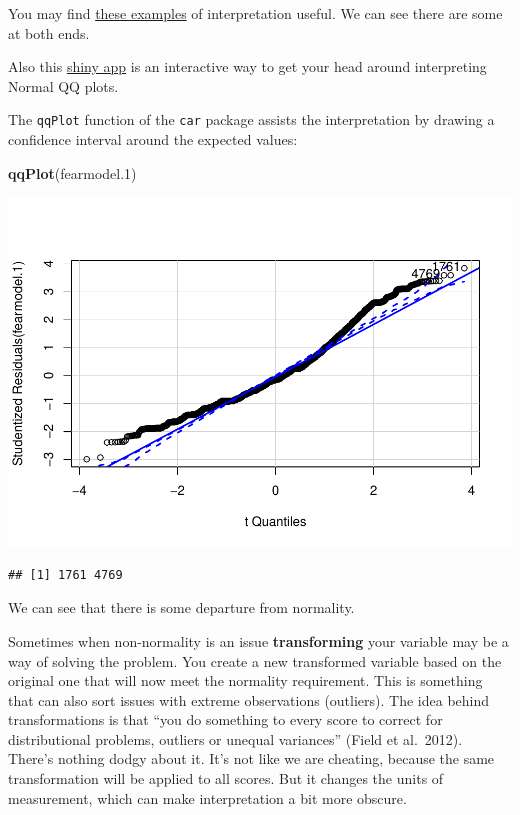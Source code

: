 \documentclass[]{book}
\newenvironment{Shaded}{\begin{snugshade}}{\end{snugshade}}
\newcommand{\FloatTok}[1]{\textcolor[rgb]{0.00,0.00,0.81}{#1}}
\newcommand{\KeywordTok}[1]{\textcolor[rgb]{0.13,0.29,0.53}{\textbf{#1}}}
\newcommand{\NormalTok}[1]{#1}
\theoremstyle{definition}
\theoremstyle{definition}
\theoremstyle{definition}
\theoremstyle{remark}
\begin{document}
You may find
\href{http://emp.byui.edu/BrownD/Stats-intro/dscrptv/graphs/qq-plot_egs.htm}{these
examples} of interpretation useful. We can see there are some at both
ends.

Also this \href{https://xiongge.shinyapps.io/QQplots/}{shiny app} is an
interactive way to get your head around interpreting Normal QQ plots.

The \texttt{qqPlot} function of the \texttt{car} package assists the
interpretation by drawing a confidence interval around the expected
values:

\begin{Shaded}
\begin{Highlighting}[]
\KeywordTok{qqPlot}\NormalTok{(fearmodel}\FloatTok{.1}\NormalTok{)}
\end{Highlighting}
\end{Shaded}

\includegraphics{06-hypothesis_testing_files/figure-latex/unnamed-chunk-16-1.pdf}

\begin{verbatim}
## [1] 1761 4769
\end{verbatim}

We can see that there is some departure from normality.

Sometimes when non-normality is an issue \textbf{transforming} your
variable may be a way of solving the problem. You create a new
transformed variable based on the original one that will now meet the
normality requirement. This is something that can also sort issues with
extreme observations (outliers). The idea behind transformations is that
``you do something to every score to correct for distributional
problems, outliers or unequal variances'' (Field et al.~2012). There's
nothing dodgy about it. It's not like we are cheating, because the same
transformation will be applied to all scores. But it changes the units
of measurement, which can make interpretation a bit more obscure.
\end{document}
